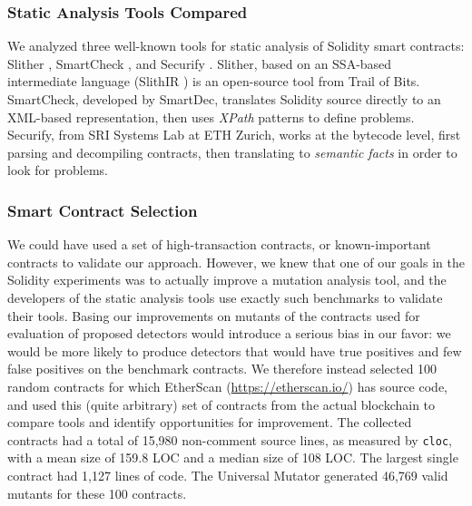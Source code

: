 \subsubsection{Static Analysis Tools Compared}


We analyzed three well-known tools for static analysis of Solidity smart contracts: Slither \cite{slither}, SmartCheck \cite{smartcheck}, and Securify \cite{Securify}.  Slither, based on an SSA-based intermediate language (SlithIR \cite{slither}) is an open-source tool from Trail of Bits.  SmartCheck, developed by SmartDec, translates Solidity source directly to an XML-based representation, then uses \emph{XPath} patterns to define problems.  Securify, from SRI Systems Lab at ETH Zurich, works at the bytecode level, first parsing and decompiling contracts, then translating to \emph{semantic facts} in order to look for problems.

\subsubsection{Smart Contract Selection}

We could have used a set of high-transaction contracts, or known-important contracts to validate our approach.  However, we knew that one of our goals in the Solidity experiments was to actually improve a mutation analysis tool, and the developers of the static analysis tools use exactly such benchmarks to validate their tools.  Basing our improvements on mutants of the contracts used for evaluation of proposed detectors would introduce a serious bias in our favor: we would be more likely to produce detectors that would have true positives and few false positives on the benchmark contracts.  We therefore instead selected 100 random contracts for which EtherScan (\url{https://etherscan.io/}) has source code, and used this (quite arbitrary) set of contracts from the actual blockchain to compare tools and identify opportunities for improvement.  The collected contracts had a total of 15,980 non-comment source lines, as measured by {\tt cloc}, with a mean size of 159.8 LOC and a median size of 108 LOC.  The largest single contract had 1,127 lines of code.  The Universal Mutator generated 46,769 valid mutants for these 100 contracts.


